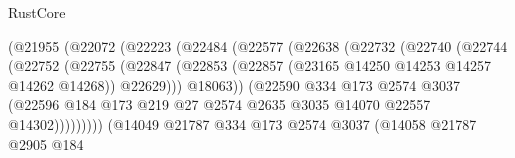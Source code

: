 \begin{lexlean}{RustCore}
\begin{coremodule}
                                (@21955
                                  (@22072
                                    (@22223
                                      (@22484
                                        (@22577
                                          (@22638
                                            (@22732
                                              (@22740
                                                (@22744
                                                  (@22752
                                                    (@22755
                                                      (@22847
                                                        (@22853
                                                          (@22857
                                                            (@23165
                                                              @14250
                                                              @14253
                                                              @14257
                                                              @14262
                                                              @14268))
                                                          @22629)))
                                                    @18063))
                                                (@22590
                                                  @334
                                                  @173
                                                  @2574
                                                  @3037
                                                  (@22596
                                                    @184
                                                    @173
                                                    @219
                                                    @27
                                                    @2574
                                                    @2635
                                                    @3035
                                                    @14070
                                                    @22557
                                                    @14302)))))))))
                                  (@14049
                                    @21787
                                    @334
                                    @173
                                    @2574
                                    @3037
                                    (@14058
                                      @21787
                                      @2905
                                      @184

\end{coremodule}
\end{lexlean}
